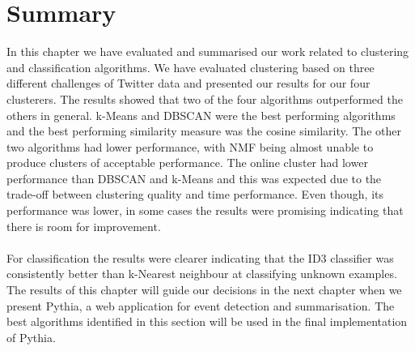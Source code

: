 \section{Summary}
In this chapter we have evaluated and summarised our work related to clustering and classification algorithms. We have evaluated
clustering based on three different challenges of Twitter data and presented our results for our four clusterers. The results showed that 
two of the four algorithms outperformed the others in general. k-Means and DBSCAN were the best performing algorithms and the best performing similarity measure
was the cosine similarity. The other two algorithms had lower performance, with NMF being almost unable to produce clusters of acceptable performance. The online cluster
had lower performance than DBSCAN and k-Means and this was expected due to the trade-off between clustering quality and time performance. Even though, its performance was lower, in some cases
the results were promising indicating that there is room for improvement. \\\\
For classification the results were clearer indicating that the ID3 classifier was consistently better than k-Nearest neighbour at classifying unknown examples. The results of this chapter will guide our 
decisions in the next chapter when we present Pythia, a web application for event detection and summarisation. The best algorithms identified in this section will be used in the final implementation of Pythia.  


